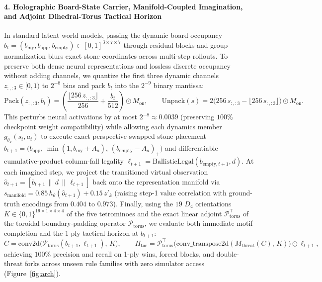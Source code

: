 \documentclass[preprint,3p,times]{elsarticle}
\begin{document}
\paragraph{4. Holographic Board-State Carrier, Manifold-Coupled Imagination, and Adjoint Dihedral-Torus Tactical Horizon}
In standard latent world models, passing the dynamic board occupancy $b_t = (b_{\text{my}}, b_{\text{opp}}, b_{\text{empty}}) \in [0,1]^{3\times 7\times 7}$ through residual blocks and group normalization blurs exact stone coordinates across multi-step rollouts. To preserve both dense neural representations and lossless discrete occupancy without adding channels, we quantize the first three dynamic channels $z_{:,:3} \in [0,1)$ to $2^{-8}$ bins and pack $b_t$ into the $2^{-9}$ binary mantissa:
\begin{equation}
    \mathrm{Pack}(z_{:,:3}, b_t) = \left(\frac{\lfloor 256\, z_{:,:3} \rfloor}{256} + \frac{b_t}{512}\right) \odot M_{\text{on}}, \qquad
    \mathrm{Unpack}(s) = 2\big(256\, s_{:,:3} - \lfloor 256\, s_{:,:3} \rfloor\big) \odot M_{\text{on}}.
\end{equation}
This perturbs neural activations by at most $2^{-8} \approx 0.0039$ (preserving $100\%$ checkpoint weight compatibility) while allowing each dynamics member $g_{\theta_k}(s_t, a_t)$ to execute exact perspective-swapped stone placement $b_{t+1} = \big(b_{\text{opp}},\, \min(1, b_{\text{my}} + A_a),\, (b_{\text{empty}} - A_a)_+\big)$ and differentiable cumulative-product column-fall legality $\ell_{t+1} = \mathrm{BallisticLegal}(b_{\text{empty}, t+1}, d)$. At each imagined step, we project the transitioned virtual observation $\hat{o}_{t+1} = [b_{t+1} \,\|\, d \,\|\, \ell_{t+1}]$ back onto the representation manifold via $s_{\text{manifold}} = 0.85\, h_\theta(\hat{o}_{t+1}) + 0.15\, z'_{k}$ (raising step-1 value correlation with ground-truth encodings from $0.404$ to $0.973$). Finally, using the $19$ $D_4$ orientations $K \in \{0,1\}^{19 \times 1 \times 4 \times 4}$ of the five tetrominoes and the exact linear adjoint $\mathcal{P}_{\text{torus}}^\top$ of the toroidal boundary-padding operator $\mathcal{P}_{\text{torus}}$, we evaluate both immediate motif completion and the 1-ply tactical horizon at $b_{t+1}$:
\begin{equation}
    C = \mathrm{conv2d}\big(\mathcal{P}_{\text{torus}}(b_{t+1}, \ell_{t+1}),\, K\big), \qquad
    H_{\text{tac}} = \mathcal{P}_{\text{torus}}^\top\big(\mathrm{conv\_transpose2d}(M_{\text{threat}}(C),\, K)\big) \odot \ell_{t+1},
\end{equation}
achieving $100\%$ precision and recall on 1-ply wins, forced blocks, and double-threat forks across unseen rule families with zero simulator access (Figure~\ref{fig:arch}).
\end{document}
